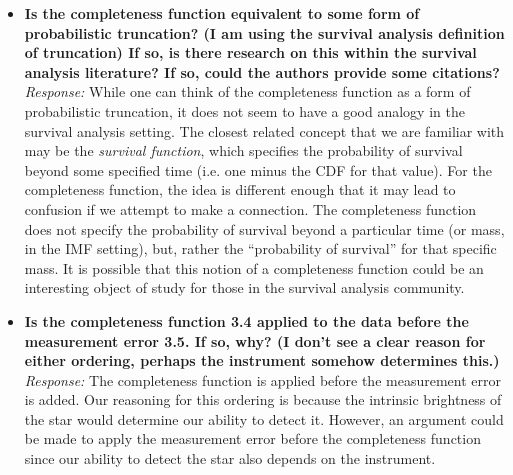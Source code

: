 \documentclass[11pt, oneside]{article}   	%
\newcommand{\todo}[1]{{\color{red}[[\textbf{TODO: }#1]]}}
\begin{document}
\begin{itemize}
\item {\bf Is the completeness function equivalent to some form of probabilistic truncation? (I am using the survival analysis definition of truncation) If so, is there research on this within the survival analysis literature? If so, could the authors provide some citations?} \\
\noindent \emph{Response:}  While one can think of the completeness function as a form of probabilistic truncation, it does not seem to have a good analogy in the survival analysis setting.  The closest related concept that we are familiar with may be the \emph{survival function}, which specifies the probability of survival beyond some specified time (i.e. one minus the CDF for that value).  For the completeness function, the idea is different enough that it may lead to confusion if we attempt to make a connection.  The completeness function does not specify the probability of survival beyond a particular time (or mass, in the IMF setting), but, rather the ``probability of survival'' for that specific mass.  It is possible that this notion of a completeness function could be an interesting object of study for those in the survival analysis community.
\bigskip

\item {\bf Is the completeness function 3.4 applied to the data before the measurement error 3.5. If so, why? (I don't see a clear reason for either ordering, perhaps the instrument somehow determines this.)} \\
\noindent \emph{Response:}  The completeness function is applied before the measurement error is added.  Our reasoning for this ordering is because the intrinsic brightness of the star would determine our ability to detect it.  However, an argument could be made to apply the measurement error before the completeness function since our ability to detect the star also depends on the instrument.
\bigskip


\end{itemize}
\end{document}
